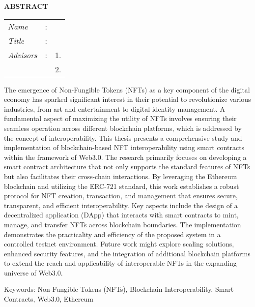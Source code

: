 \begin{center}
  \large\textbf{ABSTRACT}
\end{center}


\vspace{2ex}

\begingroup
\setlength{\tabcolsep}{0pt}

\noindent
\begin{tabularx}{\textwidth}{l >{\centering}m{3em} X}
  \emph{Name}     & : & \name{}         \\

  \emph{Title}    & : & \engtatitle{}   \\

  \emph{Advisors} & : & 1. \advisor{}   \\
                  &   & 2. \coadvisor{} \\
\end{tabularx}
\endgroup

The emergence of Non-Fungible Tokens (NFTs) as a key component of the digital economy has sparked significant interest in their potential to revolutionize various industries, from art and entertainment to digital identity management. A fundamental aspect of maximizing the utility of NFTs involves ensuring their seamless operation across different blockchain platforms, which is addressed by the concept of interoperability. This thesis presents a comprehensive study and implementation of blockchain-based NFT interoperability using smart contracts within the framework of Web3.0. The research primarily focuses on developing a smart contract architecture that not only supports the standard features of NFTs but also facilitates their cross-chain interactions. By leveraging the Ethereum blockchain and utilizing the ERC-721 standard, this work establishes a robust protocol for NFT creation, transaction, and management that ensures secure, transparent, and efficient interoperability. Key aspects include the design of a decentralized application (DApp) that interacts with smart contracts to mint, manage, and transfer NFTs across blockchain boundaries. The implementation demonstrates the practicality and efficiency of the proposed system in a controlled testnet environment. Future work might explore scaling solutions, enhanced security features, and the integration of additional blockchain platforms to extend the reach and applicability of interoperable NFTs in the expanding universe of Web3.0.

Keywords: Non-Fungible Tokens (NFTs), Blockchain Interoperability, Smart Contracts, Web3.0, Ethereum
